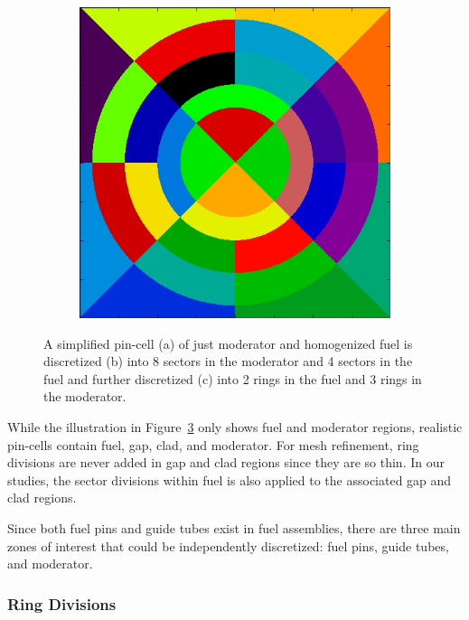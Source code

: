 \begin{figure}[h!]
\begin{subfigure}{0.3\textwidth}
		\caption{}
		\label{fig:rings-sectors-b}
	\end{subfigure}
	\begin{subfigure}{0.3\textwidth}
		\centering
		\includegraphics[width=\linewidth]{figures/ring_sector_discr.jpg}
		\caption{}
		\label{fig:rings-sectors-c}
	\end{subfigure}
	\caption[]{A simplified pin-cell (a) of just moderator and homogenized fuel is discretized (b) into 8 sectors in the moderator and 4 sectors in the fuel and further discretized (c) into 2 rings in the fuel and 3 rings in the moderator.}
	\label{fig:rings-sectors}
\end{figure}

While the illustration in Figure~\ref{fig:rings-sectors} only shows fuel and moderator regions, realistic pin-cells contain fuel, gap, clad, and moderator. For mesh refinement, ring divisions are never added in gap and clad regions since they are so thin. In our studies, the sector divisions within fuel is also applied to the associated gap and clad regions.

Since both fuel pins and guide tubes exist in fuel assemblies, there are three main zones of interest that could be independently discretized: fuel pins, guide tubes, and moderator.

\subsubsection{Ring Divisions}

